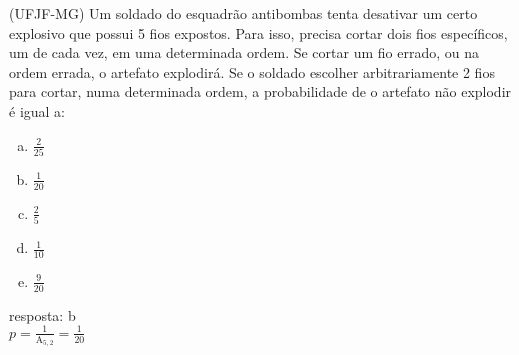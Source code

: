\begin{ex}
(UFJF-MG) Um soldado do esquadrão antibombas tenta desativar um certo explosivo que possui 5 fios expostos. Para isso, precisa cortar dois fios específicos, um de cada vez, em uma determinada ordem. Se cortar um fio errado, ou na ordem errada, o artefato explodirá. Se o soldado escolher arbitrariamente 2 fios para cortar, numa determinada ordem, a probabilidade de o artefato não explodir é igual a:
   \begin{enumerate}[(a)]
   \item $\frac{2}{25}$
   \item $\frac{1}{20}$
   \item $\frac{2}{5}$
   \item $\frac{1}{10}$
   \item $\frac{9}{20}$
   \end{enumerate}
     \begin{sol}
       resposta: b \\
       $p=\frac{1}{\mathrm{A}_{5,2}}=\frac{1}{20}$
     \end{sol}
\end{ex}